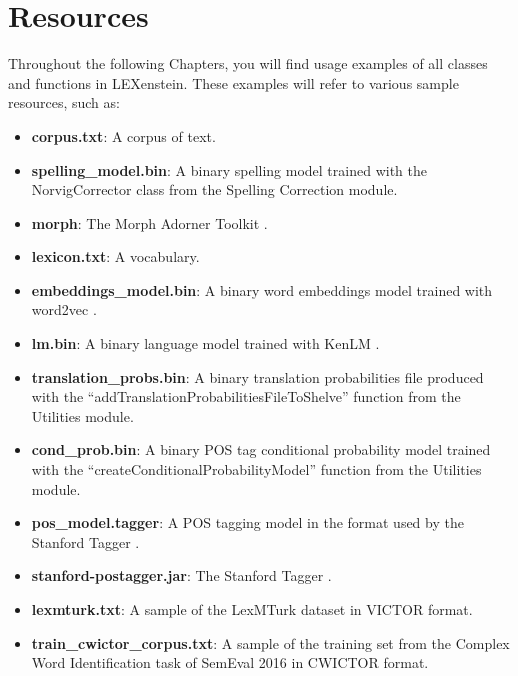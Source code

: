 \section{Resources}

Throughout the following Chapters, you will find usage examples of all classes and functions in LEXenstein. These examples will refer to various sample resources, such as:

\begin{itemize}
	\item \textbf{corpus.txt}: A corpus of text.
	
	\item \textbf{spelling\_model.bin}: A binary spelling model trained with the NorvigCorrector class from the Spelling Correction module.
	
	\item \textbf{morph}: The Morph Adorner Toolkit \cite{Paetzold15mat}.
	
	\item \textbf{lexicon.txt}: A vocabulary.
	
	\item \textbf{embeddings\_model.bin}: A binary word embeddings model trained with word2vec \cite{mikolov2013efficient}.
	
	\item \textbf{lm.bin}: A binary language model trained with KenLM \cite{kenlm}.
	
	\item \textbf{translation\_probs.bin}: A binary translation probabilities file produced with the ``addTranslationProbabilitiesFileToShelve'' function from the Utilities module.
	
	\item \textbf{cond\_prob.bin}: A binary POS tag conditional probability model trained with the ``createConditionalProbabilityModel'' function from the Utilities module.
	
	\item \textbf{pos\_model.tagger}: A POS tagging model in the format used by the Stanford Tagger \cite{stanfordparser}.
	
	\item \textbf{stanford-postagger.jar}: The Stanford Tagger \cite{stanfordparser}.
	
	\item \textbf{lexmturk.txt}: A sample of the LexMTurk dataset \cite{Horn2014} in VICTOR format.
	
	\item \textbf{train\_cwictor\_corpus.txt}: A sample of the training set from the Complex Word Identification task of SemEval 2016 \cite{Paetzold2016SemEval} in CWICTOR format.
	

\end{itemize}
